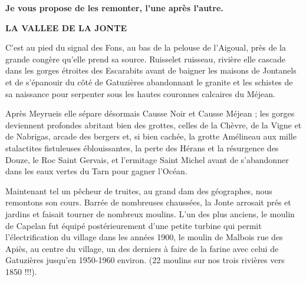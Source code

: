 
\begin{center}

\vspace{1em}

\textbf{Je vous propose de les remonter, l’une après l’autre.}

\vspace{1.5em}

{\Large\bfseries LA VALLEE DE LA JONTE}
\end{center}

\medskip

C’est au pied du signal des Fons, au bas de la pelouse de l’Aigoual, près de la grande congère
qu’elle prend sa source. Ruisselet ruisseau, rivière elle cascade dans les gorges étroites des
Escarabits avant de baigner les maisons de Jontanels et de s’épanouir du côté de Gatuzières
abandonnant le granite et les schistes de sa naissance pour serpenter sous les hautes couronnes
calcaires du Méjean.

\medskip

Après Meyrueis elle sépare désormais Causse Noir et Causse Méjean ; les gorges deviennent
profondes abritant bien des grottes, celles de la Chèvre, de la Vigne et de Nabrigas, arcade des
bergers et, si bien cachée, la grotte Amélineau aux mille stalactites fistuleuses éblouissantes,
la perte des Hérans et la résurgence des Douze, le Roc Saint Gervais, et l’ermitage Saint
Michel avant de s’abandonner dans les eaux vertes du Tarn pour gagner l’Océan.

\medskip

Maintenant tel un pêcheur de truites, au grand dam des géographes, nous remontons son cours.
Barrée de nombreuses chaussées, la Jonte arrosait prés et jardins et faisait tourner de
nombreux moulins. L’un des plus anciens, le moulin de Capelan fut équipé postérieurement
d’une petite turbine qui permit l’électrification du village dans les années 1900, le moulin de
Malbois rue des Apiès, au centre du village, un des derniers à faire de la farine avec celui de
Gatuzières jusqu’en 1950-1960 environ. (22 moulins sur nos trois rivières vers 1850 !!!).

